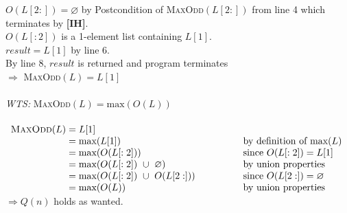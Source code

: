 \documentclass[12pt]{article}
\begin{document}
\begin{minipage}{\dimexpr\textwidth-10mm}
	\hfill\begin{minipage}{\dimexpr\textwidth-10mm} %
		$O(L[2:]) = \varnothing$ by Postcondition of \textsc{MaxOdd}$(L[2:])$ from line 4 which terminates by \textbf{[IH]}.\\
		$O(L[:2])$ is a 1-element list containing $L[1]$.\\
		$result = L[1]$ by line 6.\\
		By line 8, $result$ is returned and program terminates\\
		$\Longrightarrow$  \textsc{MaxOdd}$(L) = L[1]$
		\\\\
		\emph{WTS:} \textsc{MaxOdd}$(L) = \text{max}(O(L))$
		\\\\
		$\begin{array}{l@{}>{\displaystyle}ll}
				\text{\textsc{MaxOdd}}(L) & {}= L[1]                                                 &                                   \\
				                          & {}= \text{max}(L[1])                                     & \text{by definition of max}(L)    \\
				                          & {}= \text{max}(O(L[:2]))                                 & \text{since $O(L[:2]) = L[1]$}    \\
				                          & {}= \text{max}(O(L[:2]) \ \cup \ \varnothing)            & \text{by union properties}        \\
				                          & {}= \text{max}(O(L[:2]) \ \cup \ O(L[2:])) \qquad \qquad & \text{since $O(L[2:]) = \varnothing$} \\
				                          & {}= \text{max}(O(L))                                     & \text{by union properties}        \\
			\end{array}$
		$\Longrightarrow Q(n)$ holds as wanted.\\
	\end{minipage}
\end{minipage}
\newpage
\end{document}
